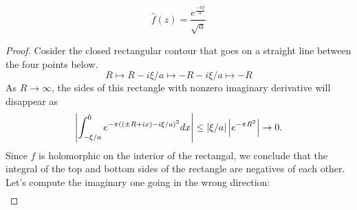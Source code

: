 \documentclass{homework}
\begin{document}
                                                                                                  \begin{solution}

                                                                                                  \begin{lemma}
                                                                                                  \[
                                                                                                  \hat{f}(z) = \frac{e^{\frac{-\pi \xi}{a}}}{\sqrt{a}}
                                                                                                  \]
                                                                                                  \end{lemma}
                                                                                                  \begin{proof}
                                                                                                  Cosider the closed rectangular contour that goes on a straight line between the four points below.
                                                                                                  \[
                                                                                                  R \mapsto R - i\xi/a \mapsto - R - i\xi/a \mapsto -R
                                                                                                  \]
                                                                                                  As $R\to\infty$, the sides of this rectangle with nonzero imaginary derivative will disappear as
                                                                                                  \[
                                                                                                  \left|\int_{-\xi/a}^{0} e^{-\pi((\pm R+ix) -i\xi/a)^2} dx\right| \leq \left|\xi/a\right| \left|e^{-\pi R^2}\right|\to 0.
                                                                                                  \]
                                                                                                  Since $f$ is holomorphic on the interior of the rectangal, we conclude that the integral of the top and bottom sides of the rectangle are negatives of each other. Let's compute the imaginary one going in the wrong direction:
                                                                                                  \begin{align*}

\end{align*}
\end{proof}
\end{solution}
\end{document}
